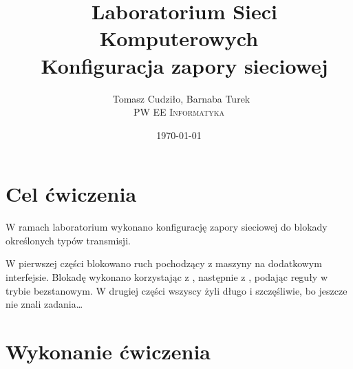 \documentclass[a4paper,10pt,notitlepage]{article}
\begin{document}
\title{\
Laboratorium Sieci Komputerowych\\\
Konfiguracja zapory sieciowej
}
\author{\
Tomasz Cudziło, Barnaba Turek\\
\textsc{PW EE Informatyka}\\[6pt]
}
\date{\today}

\maketitle
\tableofcontents


\section{Cel ćwiczenia}

W ramach laboratorium wykonano konfigurację zapory sieciowej do blokady
określonych typów transmisji.

W pierwszej części blokowano ruch \ssh{} pochodzący z maszyny \volt{} na
dodatkowym interfejsie. Blokadę wykonano korzystając z \pf, następnie z \ipfw,
podając reguły w trybie bezstanowym. W drugiej części wszyscy żyli długo i
szczęśliwie, bo jeszcze nie znali zadania\dots


\section{Wykonanie ćwiczenia}

%




\end{document}
